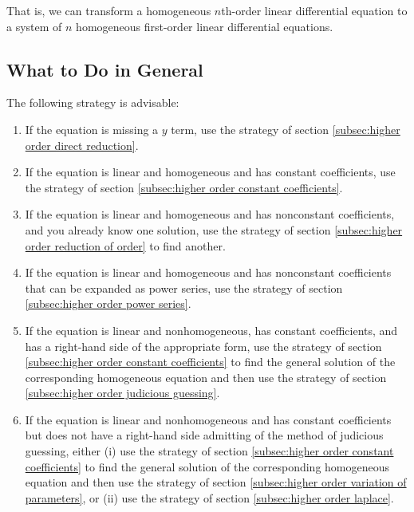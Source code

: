 \documentclass{myart}
\begin{document}
That is, we can transform a homogeneous $n$th-order linear differential equation to a system of $n$ homogeneous first-order linear differential equations.

\subsection{What to Do in General} \label{subsec:higher order strategy}

The following strategy is advisable:
\begin{enumerate}
\item If the equation is missing a $y$ term, use the strategy of section \ref{subsec:higher order direct reduction}.
\item If the equation is linear and homogeneous and has constant coefficients, use the strategy of section \ref{subsec:higher order constant coefficients}.
\item If the equation is linear and homogeneous and has nonconstant coefficients, and you already know one solution, use the strategy of section \ref{subsec:higher order reduction of order} to find another.
\item If the equation is linear and homogeneous and has nonconstant coefficients that can be expanded as power series, use the strategy of section \ref{subsec:higher order power series}.
\item If the equation is linear and nonhomogeneous, has constant coefficients, and has a right-hand side of the appropriate form, use the strategy of section \ref{subsec:higher order constant coefficients} to find the general solution of the corresponding homogeneous equation and then use the strategy of section \ref{subsec:higher order judicious guessing}.
\item If the equation is linear and nonhomogeneous and has constant coefficients but does not have a right-hand side admitting of the method of judicious guessing, either (i) use the strategy of section \ref{subsec:higher order constant coefficients} to find the general solution of the corresponding homogeneous equation and then use the strategy of section \ref{subsec:higher order variation of parameters}, or (ii) use the strategy of section \ref{subsec:higher order laplace}.
\end{enumerate}
\end{document}
